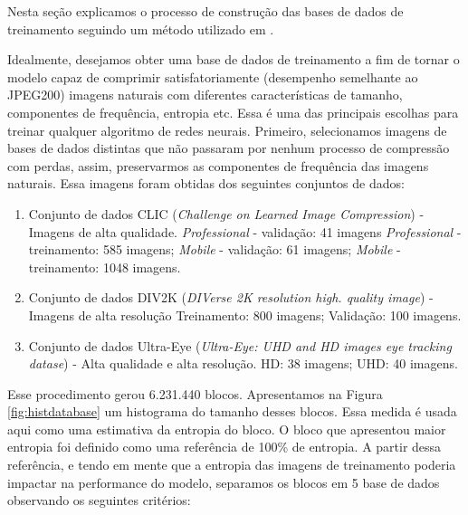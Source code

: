 Nesta seção explicamos o processo de construção das bases de dados de treinamento seguindo um método utilizado em \cite{DeliverableJuly}.


Idealmente, desejamos obter uma base de dados de treinamento a fim de tornar o modelo capaz de comprimir satisfatoriamente (desempenho semelhante ao JPEG200) imagens naturais com diferentes características de tamanho, componentes de frequência, entropia etc. Essa é uma das principais escolhas para treinar qualquer algoritmo de redes neurais.  
Primeiro, selecionamos imagens de bases de dados distintas que não passaram por nenhum processo de compressão com perdas, assim, preservarmos as componentes de frequência das imagens naturais. Essa imagens foram obtidas dos seguintes conjuntos de dados:

\begin{enumerate}
	\item Conjunto de dados CLIC \cite{bib:clic} (\textit{Challenge on Learned Image Compression}) - Imagens de alta qualidade.
	\subitem \textit{Professional} - validação: 41 imagens
	\subitem \textit{Professional} - treinamento: 585 imagens;
	\subitem \textit{Mobile} - validação: 61 imagens;
	\subitem \textit{Mobile} - treinamento: 1048 imagens.
	\item Conjunto de dados DIV2K \cite{bib:div2k} (\textit{DIVerse 2K resolution high.
		quality image}) - Imagens de alta resolução
	\subitem Treinamento: 800 imagens;
	\subitem Validação: 100 imagens.
	\item Conjunto de dados Ultra-Eye \cite{bib:ultraeye} (\textit{Ultra-Eye: UHD and HD images eye tracking datase}) - Alta qualidade e alta resolução.
	\subitem HD: 38 imagens;
	\subitem UHD: 40 imagens.
\end{enumerate}

Esse procedimento gerou 6.231.440 blocos. Apresentamos na Figura \ref{fig:histdatabase} um histograma do tamanho desses blocos. Essa medida é usada aqui como uma estimativa da entropia do bloco. 
O bloco que apresentou maior entropia foi definido como uma referência de 100\% de entropia. A partir dessa referência, e tendo em mente que a entropia das imagens de treinamento poderia impactar na performance do modelo, separamos os blocos em 5 base de dados observando os seguintes critérios:

